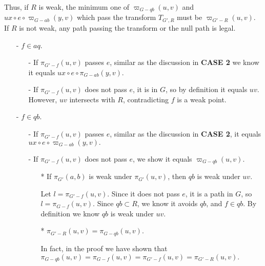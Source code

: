 \documentclass[11pt]{article}
\theoremstyle{plain}
\theoremstyle{definition}
\newcommand{\new}[1]{\pi_{G'}(#1)}
\newcommand{\og}[3]{\pi_{G-#3}\left(#1,#2\right)}
\newcommand{\nng}[3]{\pi_{G'-#3}\left(#1,#2\right)}
\newcommand{\odg}[3]{\varpi_{G-#3}\left(#1,#2\right)}
\newcommand{\ndg}[3]{\varpi_{G'-#3}\left(#1,#2\right)}
\begin{document}
Thus, if $R$ is weak, the minimum one of $\odg{u}{v}{qb}$ and $ux\circ e\circ \odg{y}{v}{ab}$ which pass the transform $T_{G',R}$ must be $\ndg{u}{v}{R}$. If $R$ is not weak, any path passing the transform or the null path is legal.

\iffalse
\begin{itemize}
    \vspace{5pt}
    \item[-] $f\in aq.$
    \vspace{5pt}
    \begin{itemize}
        \vspace{5pt}
        \item[-] If $\nng{u}{v}{f}$ passes $e$, similar as the discussion in \textbf{CASE 2} we know it equals $ux\circ e\circ\og{y}{v}{ab}.$ 
        \item[-] If $\nng{u}{v}{f}$ does not pass $e$, it is in $G$, so by definition it equals $uv.$ However, $uv$ intersects with $R$, contradicting $f$ is a weak point.
        \vspace{5pt}
    \end{itemize}
    \vspace{5pt}
    \item[-] $f\in qb.$
    \vspace{5pt}
    \begin{itemize}
        \item[-] If $\nng{u}{v}{f}$ passes $e$, similar as the discussion in \textbf{CASE 2}, it equals $ux\circ e\circ\odg{y}{v}{ab}.$  
        \item[-] If $\nng{u}{v}{f}$ does not pass $e$, we show it equals $\odg{u}{v}{qb}.$
        \begin{itemize}
            \vspace{5pt}
            \item[*] If $\new{a, b}$ is weak under $\new{u, v}$, then $qb$ is weak under $uv.$
            
        \vspace{5pt}
            Let $l=\nng{u}{v}{f}.$  Since it does not pass $e$, it is a path in $G$, so $l=\og{u}{v}{f}.$ Since $qb\subset R$, we know it avoids $qb$, and $f\in qb.$ By definition we know $qb$ is weak under $uv.$
        \vspace{5pt}
            \item[*] $\nng{u}{v}{R}=\og{u}{v}{qb}.$
            
        \vspace{5pt}
            In fact, in the proof we have shown that $\og{u}{v}{qb}=\og{u}{v}{f}=\nng{u}{v}{f}=\nng{u}{v}{R}.$
        \end{itemize}
    \end{itemize}
\end{itemize}
\end{document}

